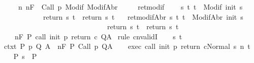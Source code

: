 \begin{isabellebody}
\ \ \ \ {\isachardoublequoteopen}{\isasymforall}{\isasymsigma}{\isachardot}\ {\isasymforall}n{\isachardot}\ {\isasymGamma}{\isacharcomma}{\isasymTheta}{\isasymTurnstile}n{\isacharcolon}\isactrlbsub {\isacharslash}F\isactrlesub \ {\isacharbraceleft}{\isasymsigma}{\isacharbraceright}\ Call\ p\ {\isacharparenleft}Modif\ {\isasymsigma}{\isacharparenright}{\isacharcomma}{\isacharparenleft}ModifAbr\ {\isasymsigma}{\isacharparenright}{\isachardoublequoteclose}\ \isanewline
\ \ \ ret{\isacharunderscore}modif{\isacharcolon}\isanewline
\ \ \ \ {\isachardoublequoteopen}{\isasymforall}s\ t{\isachardot}\ t\ {\isasymin}\ Modif\ {\isacharparenleft}init\ s{\isacharparenright}\ \isanewline
\ \ \ \ \ \ \ \ \ \ \ {\isasymlongrightarrow}\ return{\isacharprime}\ s\ t\ {\isacharequal}\ return\ s\ t{\isachardoublequoteclose}\isanewline
\ \ \ ret{\isacharunderscore}modifAbr{\isacharcolon}\ {\isachardoublequoteopen}{\isasymforall}s\ t{\isachardot}\ t\ {\isasymin}\ ModifAbr\ {\isacharparenleft}init\ s{\isacharparenright}\ \isanewline
\ \ \ \ \ \ \ \ \ \ \ \ \ \ \ \ \ \ \ \ \ \ \ \ \ \ \ \ \ {\isasymlongrightarrow}\ return{\isacharprime}\ s\ t\ {\isacharequal}\ return\ s\ t{\isachardoublequoteclose}\isanewline
\ \ \ {\isachardoublequoteopen}{\isasymGamma}{\isacharcomma}{\isasymTheta}\ {\isasymTurnstile}n{\isacharcolon}\isactrlbsub {\isacharslash}F\isactrlesub \ P\ {\isacharparenleft}call\ init\ p\ return\ c{\isacharparenright}\ Q{\isacharcomma}A{\isachardoublequoteclose}\isanewline
%
\isadelimproof
%
\endisadelimproof
%
\isatagproof
{}\isamarkupfalse%
\ {\isacharparenleft}rule\ cnvalidI{\isacharparenright}\isanewline
\ \ \isamarkupfalse%
\ s\ t\isanewline
\ \ \isamarkupfalse%
\ ctxt{\isacharcolon}\ {\isachardoublequoteopen}{\isasymforall}{\isacharparenleft}P{\isacharcomma}\ p{\isacharcomma}\ Q{\isacharcomma}\ A{\isacharparenright}{\isasymin}{\isasymTheta}{\isachardot}\ {\isasymGamma}\ {\isasymTurnstile}n{\isacharcolon}\isactrlbsub {\isacharslash}F\isactrlesub \ P\ {\isacharparenleft}Call\ p{\isacharparenright}\ Q{\isacharcomma}A{\isachardoublequoteclose}\isanewline
\ \ \isamarkupfalse%
\ exec{\isacharcolon}\ {\isachardoublequoteopen}{\isasymGamma}{\isasymturnstile}{\isasymlangle}call\ init\ p\ return\ c{\isacharcomma}Normal\ s{\isasymrangle}\ {\isacharequal}n{\isasymRightarrow}\ t{\isachardoublequoteclose}\isanewline
\ \ \isamarkupfalse%
\ P{\isacharcolon}\ {\isachardoublequoteopen}s\ {\isasymin}\ P{\isachardoublequoteclose}\isanewline

\end{isabellebody}
